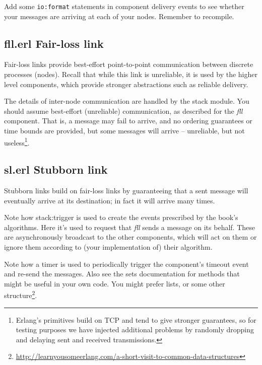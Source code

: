 \documentclass[a4paper]{article}
\begin{document}
Add some \verb!io:format! statements in component delivery events to see
whether your messages are arriving at each of your nodes. Remember to
recompile.


\subsection{fll.erl Fair-loss link} %
\label{ssub:fll_erl}

Fair-loss links provide best-effort point-to-point communication between
discrete processes (nodes). Recall that while this link is unreliable, it is
used by the higher level components, which provide stronger abstractions such
as reliable delivery.

The details of inter-node communication are handled by the stack module. You
should assume best-effort (unreliable) communication, as described for the
\emph{fll} component. That is, a message may fail to arrive, and no ordering
guarantees or time bounds are provided, but some messages will arrive --
unreliable, but not useless\footnote{Erlang's primitives build on TCP and tend
to give stronger guarantees, so for testing purposes we have injected
additional problems by randomly dropping and delaying sent and received
transmissions.}.


\subsection{sl.erl Stubborn link} %
\label{ssub:sl_erl_stubborn_link}

Stubborn links build on fair-loss links by guaranteeing that a sent message
will eventually arrive at its destination; in fact it will arrive many times.

Note how stack:trigger is used to create the events prescribed by the book's
algorithms. Here it's used to request that \emph{fll} sends a message on its
behalf. These are asynchronously broadcast to the other components, which will
act on them or ignore them according to (your implementation of) their
algorithm.

Note how a timer is used to periodically trigger the component's timeout event
and re-send the messages. Also see the sets documentation for methods that
might be useful in your own code. You might prefer lists, or some other
structure\footnote{\url{http://learnyousomeerlang.com/a-short-visit-to-common-data-structures}}.
\end{document}
